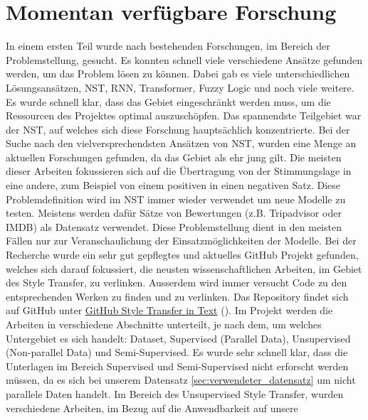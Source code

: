 \section{Momentan verfügbare Forschung}
In einem ersten Teil wurde nach bestehenden Forschungen, im Bereich der Problemstellung, gesucht. Es konnten schnell
viele verschiedene Ansätze gefunden werden, um das Problem lösen zu können. Dabei gab es viele unterschiedlichen
Lösungsansätzen, \gls{NST}, \gls{RNN}, Transformer, Fuzzy Logic und noch viele weitere. Es wurde schnell klar, dass das
Gebiet eingeschränkt werden muss, um die Ressourcen des Projektes optimal auszuschöpfen. Das spannendste Teilgebiet war
der \gls{NST}, auf welches sich diese Forschung hauptsächlich konzentrierte.
\newline
\newline
Bei der Suche nach den vielversprechendsten Ansätzen von \gls{NST}, wurden eine Menge an aktuellen Forschungen gefunden,
da das Gebiet als ehr jung gilt. Die meisten dieser Arbeiten fokussieren sich auf die Übertragung von der Stimmungslage
in eine andere, zum Beispiel von einem positiven in einen negativen Satz. Diese Problemdefinition wird im \gls{NST}
immer wieder verwendet um neue Modelle zu testen. Meistens werden dafür Sätze von Bewertungen (z.B. Tripadvisor oder
IMDB) als Datensatz verwendet. Diese Problemstellung dient in den meisten Fällen nur zur Veranschaulichung der
Einsatzmöglichkeiten der Modelle.
\newline
\newline
Bei der Recherche wurde ein sehr gut gepflegtes und aktuelles GitHub Projekt gefunden, welches sich darauf fokussiert,
die neusten wissenschaftlichen Arbeiten, im Gebiet des Style Transfer, zu verlinken. Ausserdem wird immer versucht Code
zu den entsprechenden Werken zu finden und zu verlinken. Das Repository findet sich auf GitHub unter
\hyperlink{https://github.com/fuzhenxin/Style-Transfer-in-Text}{GitHub Style Transfer in Text}
(\cite{fuzhenxin_style_transfer_in_text}).
\newline
Im Projekt werden die Arbeiten in verschiedene Abschnitte unterteilt, je nach dem, um welches Untergebiet es sich
handelt: Dataset, Supervised (Parallel Data), Unsupervised (Non-parallel Data) und Semi-Supervised. Es wurde sehr
schnell klar, dass die Unterlagen im Bereich Supervised und Semi-Supervised nicht erforscht werden müssen, da es sich
bei unserem Datensatz \ref{sec:verwendeter_datensatz} um nicht parallele Daten handelt.
\newline
Im Bereich des Unsupervised Style Transfer, wurden verschiedene Arbeiten, im Bezug auf die Anwendbarkeit auf unsere
